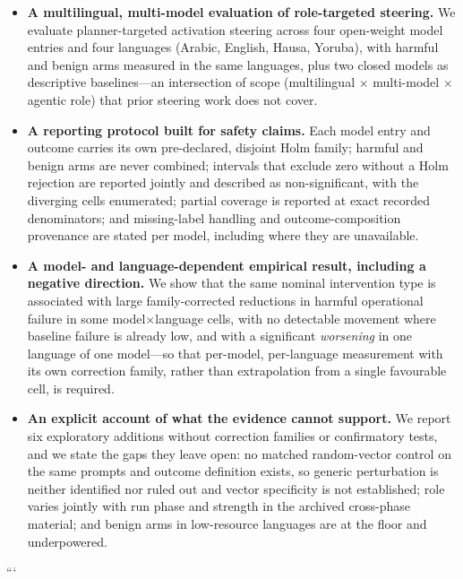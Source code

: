 \begin{itemize}
  \item \textbf{A multilingual, multi-model evaluation of role-targeted
    steering.} We evaluate planner-targeted activation steering across four
    open-weight model entries and four languages (Arabic, English, Hausa,
    Yoruba), with harmful and benign arms measured in the same languages, plus
    two closed models as descriptive baselines---an intersection of scope
    (multilingual $\times$ multi-model $\times$ agentic role) that prior
    steering work does not cover.
  \item \textbf{A reporting protocol built for safety claims.} Each model entry
    and outcome carries its own pre-declared, disjoint Holm family; harmful and
    benign arms are never combined; intervals that exclude zero without a Holm
    rejection are reported jointly and described as non-significant, with the
    diverging cells enumerated; partial coverage is reported at exact recorded
    denominators; and missing-label handling and outcome-composition provenance
    are stated per model, including where they are unavailable.
  \item \textbf{A model- and language-dependent empirical result, including a
    negative direction.} We show that the same nominal intervention type is
    associated with large family-corrected reductions in harmful operational
    failure in some model$\times$language cells, with no detectable movement
    where baseline failure is already low, and with a significant
    \emph{worsening} in one language of one model---so that per-model,
    per-language measurement with its own correction family, rather than
    extrapolation from a single favourable cell, is required.
  \item \textbf{An explicit account of what the evidence cannot support.} We
    report six exploratory additions without correction families or confirmatory
    tests, and we state the gaps they leave open: no matched random-vector
    control on the same prompts and outcome definition exists, so generic
    perturbation is neither identified nor ruled out and vector specificity is
    not established; role varies jointly with run phase and strength in the
    archived cross-phase material; and benign arms in low-resource languages are
    at the floor and underpowered.
\end{itemize}

```

